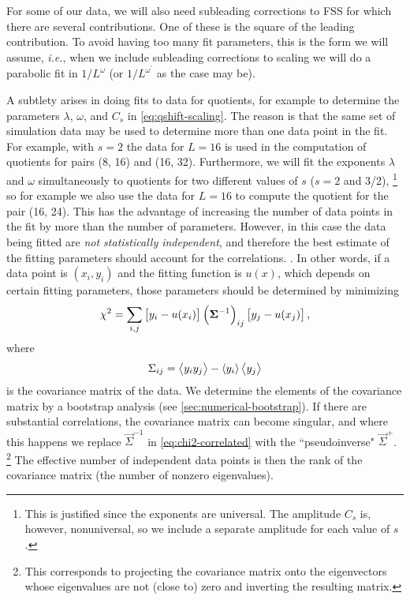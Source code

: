 For some of our data, we will also need subleading corrections to FSS for which
there are several contributions. One of these is the square of the leading
contribution. To avoid having too many fit parameters, this is the form we will
assume, \emph{i.e.}, when we include subleading corrections to scaling we will
do a parabolic fit in $1/L^{\omega}$ (or $1/L^{\omega^{\prime}}$ as the case
may be).

A subtlety arises in doing fits to data for quotients, for example to determine
the parameters $\lambda$, $\omega$, and $C_s$ in \cref{eq:qshift-scaling}. The
reason is that the same set of simulation data may be used to determine more
than one data point in the fit. For example, with $s=2$ the data for $L=16$ is
used in the computation of quotients for pairs (8, 16) and (16, 32).
Furthermore, we will fit the exponents $\lambda$ and $\omega$ simultaneously to
quotients for two different values of $s$ ($s=2$ and 3/2),%
\footnote{%
  This is justified since the exponents are universal. The amplitude $C_s$ is,
  however, nonuniversal, so we include a separate amplitude for each value of
  $s$.
}
so for example we also use the data for $L=16$ to compute the quotient for the
pair (16, 24). This has the advantage of increasing the number of data points
in the fit by more than the number of parameters. However, in this case the
data being fitted are \emph{not statistically independent}, and therefore the
best estimate of the fitting parameters should account for the correlations.
\autocite{ballesteros1996finite,ballesteros1998critical,weigel2009cross}. In
other words, if a data point is $(x_i,y_i)$ and the fitting function is $u(x)$,
which depends on certain fitting parameters, those parameters should be
determined by minimizing
\begin{equation}
  \chi^2 = \sum_{i,j}
  \left[y_i - u(x_i)\right]
  \left(\bm{\Sigma}^{-1}\right)_{ij}
  \left[y_j - u(x_j)\right],
  \label{eq:chi2-correlated}
\end{equation}
where
\begin{equation}
  \Sigma_{ij} = \left< y_i y_j \right> - \left< y_i \right>\left< y_j \right>
\end{equation}
is the covariance matrix of the data. We determine the elements of the
covariance matrix by a bootstrap analysis (see
\cref{sec:numerical-bootstrap}). If there are substantial correlations, the
covariance matrix can become singular, and where this happens we replace
$\vec{\Sigma}^{-1}$ in \cref{eq:chi2-correlated} with the ``pseudoinverse"
$\vec{\Sigma}^+$.%
\footnote{%
  This corresponds to projecting the covariance matrix onto the eigenvectors
  whose eigenvalues are not (close to) zero and inverting the resulting matrix.
}
The effective number of independent data points is then the rank of the
covariance matrix (the number of nonzero eigenvalues).


